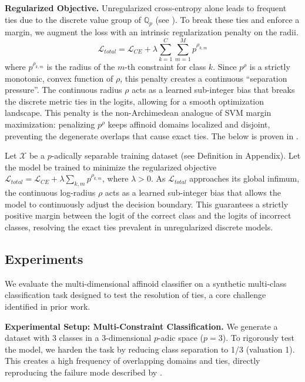 \textbf{Regularized Objective.}
Unregularized cross-entropy alone leads to frequent ties due to the discrete value group of $\mathbb{Q}_p$ (see ). To break these ties and enforce a margin, we augment the loss with an intrinsic regularization penalty on the radii.
\begin{equation}
\label{eq:regularized_loss}
    \mathcal{L}_{total} = \mathcal{L}_{CE} + \lambda \sum_{k=1}^C \sum_{m=1}^M p^{\rho_{k,m}}
\end{equation}
where $p^{\rho_{k,m}}$ is the radius of the $m$-th constraint for class $k$. Since $p^\rho$ is a strictly monotonic, convex function of $\rho$, this penalty creates a continuous ``separation pressure''. The continuous radius $\rho$ acts as a learned sub-integer bias that breaks the discrete metric ties in the logits, allowing for a smooth optimization landscape. This penalty is the non-Archimedean analogue of SVM margin maximization: penalizing $p^\rho$ keeps affinoid domains localized and disjoint, preventing the degenerate overlaps that cause exact ties. The below is proven in .

\begin{theorem}
\label{thm:logit_separation}
Let $\mathcal{X}$ be a $p$-adically separable training dataset (see Definition in Appendix). Let the model be trained to minimize the regularized objective $\mathcal{L}_{total} = \mathcal{L}_{CE} + \lambda \sum_{k,m} p^{\rho_{k,m}}$, where $\lambda > 0$. As $\mathcal{L}_{total}$ approaches its global infimum, the continuous log-radius $\rho$ acts as a learned sub-integer bias that allows the model to continuously adjust the decision boundary. This guarantees a strictly positive margin between the logit of the correct class and the logits of incorrect classes, resolving the exact ties prevalent in unregularized discrete models.
\end{theorem}


\subsection{Experiments}
\label{sec:classification_experiments}

We evaluate the multi-dimensional affinoid classifier on a synthetic multi-class classification task designed to test the resolution of ties, a core challenge identified in prior work.

\textbf{Experimental Setup: Multi-Constraint Classification.}
We generate a dataset with 3 classes in a 3-dimensional $p$-adic space ($p=3$). To rigorously test the model, we harden the task by reducing class separation to 1/3 (valuation 1). This creates a high frequency of overlapping domains and ties, directly reproducing the failure mode described by \citet{martins2025learning}.

